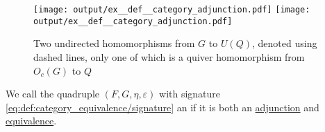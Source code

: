 \begin{example}
\begin{thmenum}
    \begin{figure}
      \hfill
      \texttt{[image: output/ex\_\_def\_\_category\_adjunction.pdf]}
      \hfill
      \texttt{[image: output/ex\_\_def\_\_category\_adjunction.pdf]}
      \hfill\hfill
      \caption{Two undirected homomorphisms from \( G \) to \( U(Q) \), denoted using dashed lines, only one of which is a quiver homomorphism from \( O_c(G) \) to \( Q \)}
      \label{fig:ex:def:category_adjunction/multgph_quiv}
    \end{figure}
  \end{thmenum}
\end{example}

\begin{definition}\label{def:adjoint_equivalence}
  We call the quadruple \( (F, G, \eta, \varepsilon) \) with signature \eqref{eq:def:category_equivalence/signature} an  if it is both an \hyperref[def:category_adjunction]{adjunction} and \hyperref[def:category_equivalence]{equivalence}.
\end{definition}

